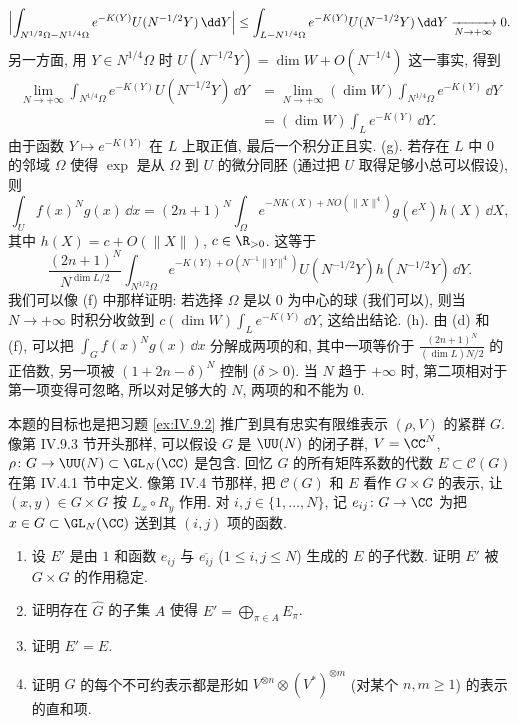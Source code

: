 \begin{solution}
\[
\Bigl|\int_{N^{1/2}\Omega - N^{1/4}\Omega}e^{-K(Y)}U(N^{-1/2}Y)\,\dd Y\Bigr| \leq \int_{L - N^{1/4}\Omega}e^{-K(Y)}U(N^{-1/2}Y)\,\dd Y \xrightarrow[N \to +\infty]{} 0.
\]
另一方面, 用 $Y \in N^{1/4}\Omega$ 时 $U(N^{-1/2}Y) = \dim W + O(N^{-1/4})$ 这一事实, 得到
\begin{align*}
\lim_{N \to +\infty}\int_{N^{1/4}\Omega}e^{-K(Y)}U(N^{-1/2}Y)\,\dd Y &= \lim_{N \to +\infty}(\dim W)\int_{N^{1/4}\Omega}e^{-K(Y)}\,\dd Y \\
&= (\dim W)\int_Le^{-K(Y)}\,\dd Y.
\end{align*}
由于函数 $Y \longmapsto e^{-K(Y)}$ 在 $L$ 上取正值, 最后一个积分正且实.
(g). 若存在 $L$ 中 $0$ 的邻域 $\Omega$ 使得 $\exp$ 是从 $\Omega$ 到 $U$ 的微分同胚 (通过把 $U$ 取得足够小总可以假设), 则
\[
\int_U f(x)^Ng(x)\,\dd x = (2n + 1)^N\int_{\Omega}e^{-NK(X) + NO(\|X\|^4)}g(e^X)h(X)\,\dd X,
\]
其中 $h(X) = c + O(\|X\|)$, $c \in \R_{>0}$. 这等于
\[
\frac{(2n + 1)^N}{N^{\dim L/2}}\int_{N^{1/2}\Omega}e^{-K(Y) + O(N^{-1}\|Y\|^4)}U(N^{-1/2}Y)h(N^{-1/2}Y)\,\dd Y.
\]
我们可以像 (f) 中那样证明: 若选择 $\Omega$ 是以 $0$ 为中心的球 (我们可以), 则当 $N \to +\infty$ 时积分收敛到 $c(\dim W)\int_Le^{-K(Y)}\,\dd Y$, 这给出结论.
(h). 由 (d) 和 (f), 可以把 $\int_G f(x)^Ng(x)\,\dd x$ 分解成两项的和, 其中一项等价于 $\frac{(2n+1)^N}{(\dim L)N/2}$ 的正倍数, 另一项被 $(1 + 2n - \delta)^N$ 控制 ($\delta > 0$). 当 $N$ 趋于 $+\infty$ 时, 第二项相对于第一项变得可忽略, 所以对足够大的 $N$, 两项的和不能为 $0$.
\end{solution}

\begin{exercise}[矩阵系数方法的推广]
\label{ex:IV.9.4}
本题的目标也是把习题 \ref{ex:IV.9.2} 推广到具有忠实有限维表示 $(\rho, V)$ 的紧群 $G$. 像第 IV.9.3 节开头那样, 可以假设 $G$ 是 $\UU(N)$ 的闭子群, $V = \CC^N$, $\rho \colon G \to \UU(N) \subset \GL_N(\CC)$ 是包含.
回忆 $G$ 的所有矩阵系数的代数 $E \subset \mathcal{C}(G)$ 在第 IV.4.1 节中定义. 像第 IV.4 节那样, 把 $\mathcal{C}(G)$ 和 $E$ 看作 $G \times G$ 的表示, 让 $(x, y) \in G \times G$ 按 $L_x \circ R_y$ 作用.
对 $i, j \in \{1, \ldots, N\}$, 记 $e_{ij} \colon G \to \CC$ 为把 $x \in G \subset \GL_N(\CC)$ 送到其 $(i, j)$ 项的函数.
\begin{enumerate}
\item[(a)] 设 $E'$ 是由 $1$ 和函数 $e_{ij}$ 与 $\overline{e_{ij}}$ ($1 \leq i, j \leq N$) 生成的 $E$ 的子代数. 证明 $E'$ 被 $G \times G$ 的作用稳定.
\item[(b)] 证明存在 $\widehat{G}$ 的子集 $A$ 使得 $E' = \bigoplus_{\pi \in A}E_{\pi}$.
\item[(c)] 证明 $E' = E$.
\item[(d)] 证明 $G$ 的每个不可约表示都是形如 $V^{\otimes n} \otimes (V^*)^{\otimes m}$ (对某个 $n, m \geq 1$) 的表示的直和项.
\end{enumerate}
\end{exercise}

